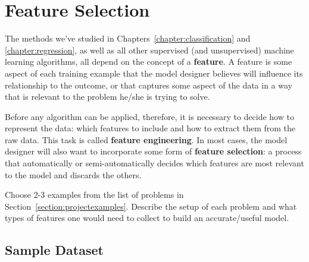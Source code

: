 \chapter{Feature Selection \label{chapter:featureselection}}


The methods we've studied in Chapters~\ref{chapter:classification} and \ref{chapter:regression}, as well as all other supervised (and unsupervised) machine learning algorithms, all depend on the concept of a \textbf{feature}. A feature is some aspect of each training example that the model designer believes will influence its relationship to the outcome, or that captures some aspect of the data in a way that is relevant to the problem he/she is trying to solve. 

Before any algorithm can be applied, therefore, it is necessary to decide how to represent the data: which features to include and how to extract them from the raw data. This task is called \textbf{feature engineering}. In most cases, the model designer will also want to incorporate some form of \textbf{feature selection}: a process that automatically or semi-automatically decides which features are most relevant to the model and discards the others.

\vspace{5mm}

\begin{question}{}
Choose 2-3 examples from the list of problems in Section~\ref{section:projectexamples}. Describe the setup of each problem and what types of features one would need to collect to build an accurate/useful model. 
\end{question}


\section{Sample Dataset}

